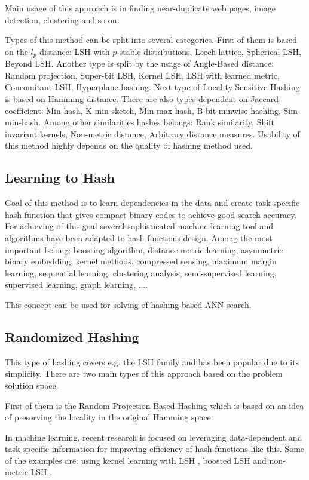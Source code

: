 Main usage of this approach is in finding near-duplicate web pages, image detection, clustering and so on. 

Types of this method can be split into several categories.
First of them is based on the $l_p$ distance: LSH with $p$-stable distributions, Leech lattice, Spherical LSH, Beyond LSH.
Another type is split by the usage of Angle-Based distance: Random projection, Super-bit LSH, Kernel LSH, LSH with learned metric, Concomitant LSH, Hyperplane hashing.
Next type of Locality Sensitive Hashing is based on Hamming distance. There are also types dependent on Jaccard coefficient: Min-hash, K-min sketch, Min-max hash, B-bit minwise hashing, Sim-min-hash.
Among other similarities hashes belongs: Rank similarity, Shift invariant kernels, Non-metric distance, Arbitrary distance measures.
Usability of this method highly depends on the quality of hashing method used.
\subsection{Learning to Hash}
Goal of this method is to learn dependencies in the data and create task-specific hash function that gives compact binary codes to achieve good search accuracy. \cite{learnHash} For achieving of this goal several sophisticated machine learning tool and algorithms have been adapted to hash functions design. Among the most important belong: boosting algorithm, distance metric learning, asymmetric binary embedding, kernel methods, compressed sensing, maximum margin learning, sequential learning, clustering analysis, semi-supervised learning, supervised learning, graph learning, ....

This concept can be used for solving of hashing-based ANN search.

\subsection{Randomized Hashing}
This type of hashing covers e.g. the LSH family and has been popular due to its simplicity. There are two main types of this approach based on the problem solution space. 

First of them is the Random Projection Based Hashing which is based on an idea of preserving the locality in the original Hamming space.

In machine learning, recent research is focused on leveraging data-dependent and task-specific information for improving efficiency of hash functions like this. Some of the examples are: using kernel learning with LSH \cite{kernelLSH}, boosted LSH \cite{boostLSH} and non-metric LSH \cite{nonMLSH}.

